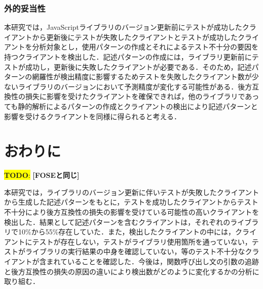 \documentclass[11pt]{jreport}
\newcommand{\todo}[1]{\colorbox{yellow}{{\bf TODO}:}{\color{red} {\textbf{[#1]}}}}
\begin{document}
\subsection{外的妥当性}
本研究では，JavaScriptライブラリのバージョン更新前にテストが成功したクライアントから更新後にテストが失敗したクライアントとテストが成功したクライアントを分析対象とし，使用パターンの作成とそれによるテスト不十分の要因を持つクライアントを検出した．記述パターンの作成には，ライブラリ更新前にテストが成功し，更新後に失敗したクライアントが必要である．そのため，記述パターンの網羅性が検出精度に影響するためテストを失敗したクライアント数が少ないライブラリのバージョンにおいて予測精度が変化する可能性がある．後方互換性の損失に影響を受けたクライアントを確保できれば，他のライブラリであっても静的解析によるパターンの作成とクライアントの検出により記述パターンと影響を受けるクライアントを同様に得られると考える．

\chapter{おわりに}\label{sec:conclusion}
\todo{FOSEと同じ}

本研究では，ライブラリのバージョン更新に伴いテストが失敗したクライアントから生成した記述パターンをもとに，テストを成功したクライアントからテスト不十分により後方互換性の損失の影響を受けている可能性の高いクライアントを検出した．結果として記述パターンを含むクライアントは，それぞれのライブラリで10\%から55\%存在していた．また，検出したクライアントの中には，クライアントにテストが存在しない，テストがライブラリ使用箇所を通っていない，テストがライブラリの実行結果の中身を確認していない，等のテスト不十分なクライアントが含まれていることを確認した．今後は，関数呼び出し文の引数の追跡と後方互換性の損失の原因の違いにより検出数がどのように変化するかの分析に取り組む．
\end{document}
